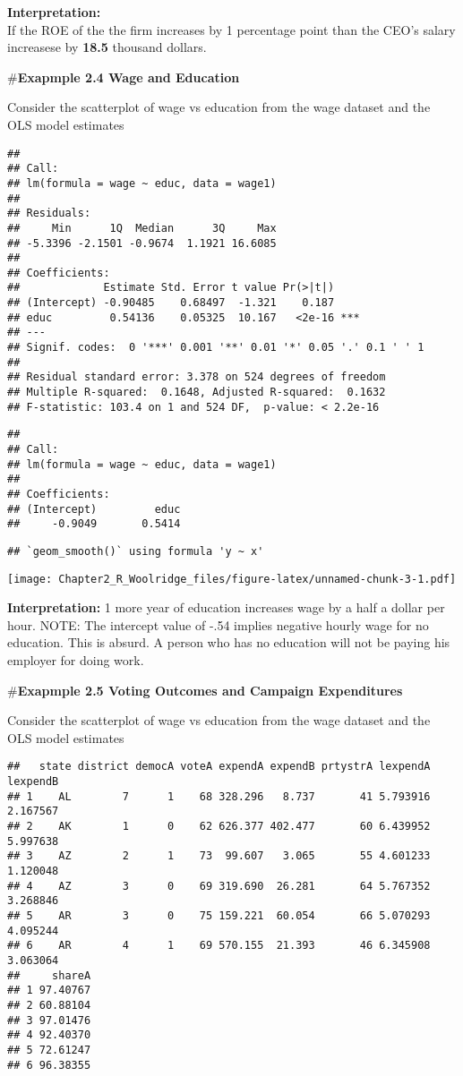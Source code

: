 \documentclass[
]{article}
\begin{document}
\textbf{Interpretation: }\\
If the ROE of the the firm increases by 1 percentage point than the
CEO's salary increasese by \textbf{18.5} thousand dollars.

\#\textbf{Exapmple 2.4 Wage and Education}

Consider the scatterplot of wage vs education from the wage dataset and
the OLS model estimates

\begin{verbatim}
## 
## Call:
## lm(formula = wage ~ educ, data = wage1)
## 
## Residuals:
##     Min      1Q  Median      3Q     Max 
## -5.3396 -2.1501 -0.9674  1.1921 16.6085 
## 
## Coefficients:
##             Estimate Std. Error t value Pr(>|t|)    
## (Intercept) -0.90485    0.68497  -1.321    0.187    
## educ         0.54136    0.05325  10.167   <2e-16 ***
## ---
## Signif. codes:  0 '***' 0.001 '**' 0.01 '*' 0.05 '.' 0.1 ' ' 1
## 
## Residual standard error: 3.378 on 524 degrees of freedom
## Multiple R-squared:  0.1648, Adjusted R-squared:  0.1632 
## F-statistic: 103.4 on 1 and 524 DF,  p-value: < 2.2e-16
\end{verbatim}

\begin{verbatim}
## 
## Call:
## lm(formula = wage ~ educ, data = wage1)
## 
## Coefficients:
## (Intercept)         educ  
##     -0.9049       0.5414
\end{verbatim}

\begin{verbatim}
## `geom_smooth()` using formula 'y ~ x'
\end{verbatim}

\texttt{[image: Chapter2\_R\_Woolridge\_files/figure-latex/unnamed-chunk-3-1.pdf]}

\textbf{Interpretation: } 1 more year of education increases wage by a
half a dollar per hour. {NOTE}: The {intercept} value of {-.54} implies
negative hourly wage for no education. This is absurd. A person who has
no education will not be paying his employer for doing work.

\#\textbf{Exapmple 2.5 Voting Outcomes and Campaign Expenditures}

Consider the scatterplot of wage vs education from the wage dataset and
the OLS model estimates

\begin{verbatim}
##   state district democA voteA expendA expendB prtystrA lexpendA lexpendB
## 1    AL        7      1    68 328.296   8.737       41 5.793916 2.167567
## 2    AK        1      0    62 626.377 402.477       60 6.439952 5.997638
## 3    AZ        2      1    73  99.607   3.065       55 4.601233 1.120048
## 4    AZ        3      0    69 319.690  26.281       64 5.767352 3.268846
## 5    AR        3      0    75 159.221  60.054       66 5.070293 4.095244
## 6    AR        4      1    69 570.155  21.393       46 6.345908 3.063064
##     shareA
## 1 97.40767
## 2 60.88104
## 3 97.01476
## 4 92.40370
## 5 72.61247
## 6 96.38355
\end{verbatim}
\end{document}
